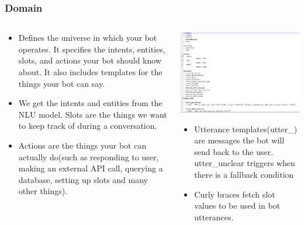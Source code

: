  \begin{frame}[fragile]\frametitle{Domain }
 
    \begin{columns}
    \begin{column}[t]{0.5\linewidth}
\begin{itemize}
\item Defines the universe in which your bot operates. It specifies the intents, entities, slots, and actions your bot should know about. It also includes templates for the things your bot can say. 
\item We get the intents and entities from the NLU model. Slots are the things we want to keep track of during a conversation. 
\item Actions are the things your bot can actually do(such as responding to user, making an external API call, querying a database, setting up slots and many other things). 
\end{itemize}
\end{column}
    \begin{column}[t]{0.5\linewidth}
\begin{center}
\includegraphics[width=\linewidth,keepaspectratio]{images/mmt5}
\end{center}
\begin{itemize}
\item Utterance templates(utter\_) are messages the bot will send back to the user. utter\_unclear triggers when there is a fallback condition 
\item Curly braces {} fetch slot values to be used in bot utterances.
\end{itemize}
\end{column}
\end{columns}
\end{frame}

